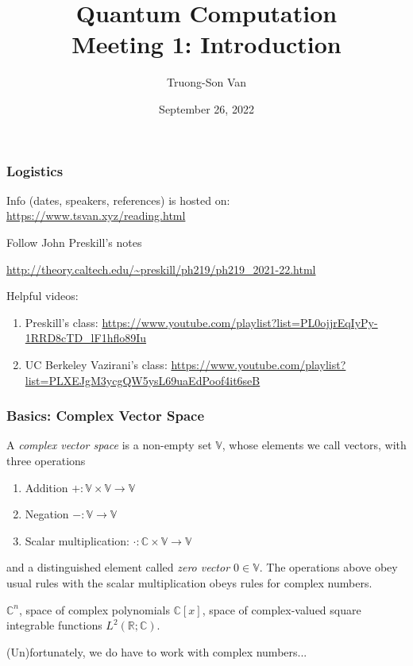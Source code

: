 \documentclass[12pt, aspectratio=169]{beamer}
\title{ Quantum Computation \\ Meeting 1: Introduction }
\author{Truong-Son Van}
\institute{Fulbright University Vietnam Reading Group}
\date{September 26, 2022}
\begin{document}
\frame{\titlepage}

\begin{frame}
    \frametitle{Logistics}
    Info (dates, speakers, references) is hosted on: \url{https://www.tsvan.xyz/reading.html}
    
    Follow John Preskill's notes 

    \url{http://theory.caltech.edu/~preskill/ph219/ph219_2021-22.html}

    Helpful videos:
    \begin{enumerate}
        \item Preskill's class: \url{https://www.youtube.com/playlist?list=PL0ojjrEqIyPy-1RRD8cTD_lF1hflo89Iu}
        \item UC Berkeley Vazirani's class: \url{https://www.youtube.com/playlist?list=PLXEJgM3ycgQW5ysL69uaEdPoof4it6seB}
    \end{enumerate}
\end{frame}

\begin{frame}
    \frametitle{ Basics: Complex Vector Space}
    A \emph{complex vector space} is a non-empty set $\mathbb{V}$, whose elements we call vectors, with three 
    operations
    \begin{enumerate}
        \item Addition $+: \mathbb{V} \times \mathbb{V} \to \mathbb{V}$
        \item Negation $-: \mathbb{V}\to \mathbb{V}$
        \item Scalar multiplication: $\cdot : \mathbb{C} \times \mathbb{V} \to \mathbb{V}$
    \end{enumerate}
    and a distinguished element called \emph{zero vector $0\in \mathbb{V}$}.
    The operations above obey usual rules with the scalar multiplication obeys rules for complex numbers.


    \begin{example}
        $\mathbb{C}^n$, space of complex polynomials $\mathbb{C}[x]$, 
        space of complex-valued square integrable functions $L^2(\mathbb{R};\mathbb{C})$.
    \end{example}

    (Un)fortunately, we do have to work with complex numbers...
\end{frame}
\end{document}
